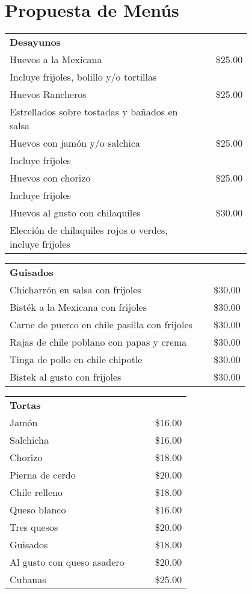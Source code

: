 \documentclass[12pt]{article}
\makeatletter
\newenvironment{Group}[1]
  {\noindent\begin{tabular*}{\textwidth}{@{}p{0.8\linewidth}@{\extracolsep{\fill}}r@{}}
    {\bfseries\large{#1}}\\[0.35em]}
  {\end{tabular*}}
\newcommand*\Entry[2]{%
  \sffamily#1 & #2}
\newcommand*\Expl[1]{%
  \hspace*{1em}\footnotesize #1}
\makeatother
\begin{document}
\section{Propuesta de Menús}
\begin{Group}{Desayunos}
\Entry{Huevos a la Mexicana}{\$25.00}\\
\Expl{Incluye frijoles, bolillo y/o tortillas}\\
\Entry{Huevos Rancheros}{\$25.00}\\
\Expl{Estrellados sobre tostadas y bañados en salsa‭}\\
\Entry{Huevos con jamón y/o salchica}{\$25.00}\\
\Expl{Incluye frijoles}\\
\Entry{Huevos con chorizo}{\$25.00}\\
\Expl{Incluye frijoles}\\
\Entry{Huevos al gusto con chilaquiles}{\$30.00}\\
\Expl{Elección de chilaquiles rojos o verdes, incluye frijoles}
\end{Group}\vspace{10pt}

\begin{Group}{Guisados}
\Entry{Chicharrón en salsa con frijoles}{\$30.00}\\
\Entry{Bisték a la Mexicana con frijoles}{\$30.00}\\
\Entry{Carne de puerco en chile pasilla con frijoles}{\$30.00}\\
\Entry{Rajas de chile poblano con papas y crema‎}{\$30.00}\\
\Entry{Tinga de pollo en chile chipotle}{\$30.00}\\
\Entry{Bistek al gusto‎ con frijoles}{\$30.00}
\end{Group}\vspace{10pt}

\begin{Group}{Tortas}
\Entry{Jamón}{\$16.00}\\
\Entry{Salchicha}{\$16.00}\\
\Entry{Chorizo}{\$18.00}\\
\Entry{Pierna de cerdo}{\$20.00}\\
\Entry{Chile relleno}{\$18.00}\\
\Entry{Queso blanco}{\$16.00}\\
\Entry{Tres quesos}{\$20.00}\\
\Entry{Guisados}{\$18.00}\\
\Entry{Al gusto con queso asadero}{\$20.00}\\
\Entry{Cubanas}{\$25.00}
\end{Group}\vspace{10pt}
\end{document}

